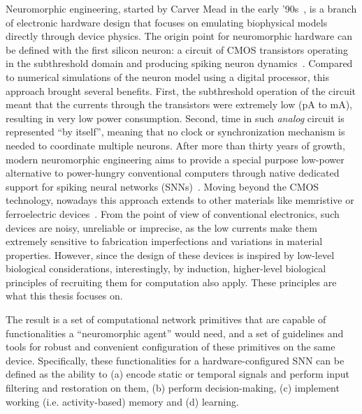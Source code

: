 Neuromorphic engineering, started by Carver Mead in the early '90s~\cite{Mead90}, is a branch of electronic hardware design that focuses on emulating biophysical models directly through device physics. The origin point for neuromorphic hardware can be defined with the first silicon neuron: a circuit of \ac{CMOS} transistors operating in the subthreshold domain and producing spiking neuron dynamics~\cite{Mahowald_Douglas91}. Compared to numerical simulations of the neuron model using a digital processor, this approach brought several benefits. First, the subthreshold operation of the circuit meant that the currents through the transistors were extremely low (pA to mA), resulting in very low power consumption. Second, time in such \emph{analog} circuit is represented ``by itself'', meaning that no clock or synchronization mechanism is needed to coordinate multiple neurons.
After more than thirty years of growth, modern neuromorphic engineering aims to provide a special purpose low-power alternative to power-hungry conventional computers through native dedicated support for spiking neural networks (SNNs)~\cite{Moradi_etal18,Neckar_etal19,Merolla_etal14a,Furber_Bogdan20,Pei_etal19}. Moving beyond the \ac{CMOS} technology, nowadays this approach extends to other materials like memristive or ferroelectric devices~\cite{Christensen_etal22,Spiga_etal20a,Chicca_Indiveri20,Xia_Yang19,Payvand_etal19,Boybat_etal18}.
From the point of view of conventional electronics, such devices are noisy, unreliable or imprecise, as the low currents make them extremely sensitive to fabrication imperfections and variations in material properties. However, since the design of these devices is inspired by low-level biological considerations, interestingly, by induction, higher-level biological principles of recruiting them for computation also apply. These principles are what this thesis focuses on.

The result is a set of computational network primitives that are capable of functionalities a ``neuromorphic agent'' would need, and a set of guidelines and tools for robust and convenient configuration of these primitives on the same device. Specifically, these functionalities for a hardware-configured SNN can be defined as the ability to (a) encode static or temporal signals and perform input filtering and restoration on them, (b) perform decision-making, (c) implement working (i.e. activity-based) memory and (d) learning.

